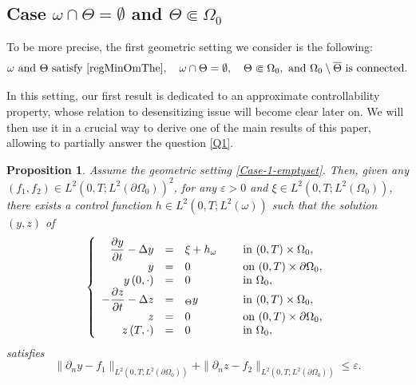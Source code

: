 \documentclass[11pt]{article}
\makeatletter
\numberwithin{equation}{section}
\newcounter{question}
\DeclareRobustCommand{\mathbbm}[1]{\csname jepbb@#1\endcsname}
\newtheorem{proposition}[theorem]{Proposition}
\theoremstyle{definition}
\makeatother
\begin{document}
\subsection*{Case \texorpdfstring{$\omega \cap \Theta = \emptyset$ and $\Theta \Subset \Omega_0$}{caseo}}

To be more precise, the first geometric setting we consider is the following:
\begin{equation}
\label{Case-1-emptyset}
\omega\text{ and }\Theta\text{ satisfy }\eqref{regMinOmThe},\quad
\omega \cap \Theta = \emptyset,
\quad \Theta \Subset \Omega_0,
\text{ and } \Omega_0 \setminus \overline\Theta \text{ is connected}.
\end{equation}

In this setting, our first result is dedicated to an approximate controllability property, whose relation to desensitizing issue will become clear later on. We will then use it in a crucial way to derive one of the main results of this paper, allowing to partially answer the question \ref{Q1}.

\begin{proposition}
\label{Prop-Approx-Cont-Case1}
Assume the geometric setting \eqref{Case-1-emptyset}. Then, given any $(f_1, f_2) \in L^2(0,T; L^2(\partial \Omega_0))^2$, for any $\varepsilon >0$ and $\xi \in L^2(0,T; L^2(\Omega_0))$, there exists a control function $h \in L^2(0,T; L^2(\omega))$ such that the solution $(y,z)$ of
\begin{equation}
\label{Coupled-Heat-Approx}
\left\{
\begin{array}{rcll}
\dfrac{\partial y}{\partial t}-\Delta y &=&\xi +h\mathbbm{1}_{\omega}\quad&\text{ in }(0,T) \times \Omega_0,
\\
y &=& 0 &\text{ on }(0,T) \times \partial \Omega_0,
\\
y\left(0,\cdot\right) &=& 0 &\text{ in }\Omega_0,
\\
-\dfrac{\partial z}{\partial t}-\Delta z &=&\mathbbm{1}_{\Theta}y &\text{ in }(0,T) \times \Omega_0,
\\
z &=& 0 &\text{ on }(0,T) \times \partial \Omega_0,
\\
z\left(T,\cdot\right) &=& 0 &\text{ in }\Omega_0,
\end{array}
\right.
\end{equation}
satisfies
\begin{equation}
\label{Approx-Cont}
\| \partial_n y - f_1 \|_{L^2(0,T; L^2(\partial\Omega_0))}
+
\| \partial_n z - f_2 \|_{L^2(0,T; L^2(\partial\Omega_0))}
\leq
\varepsilon.
\end{equation}
\end{proposition}
\end{document}
